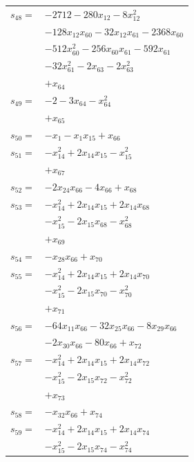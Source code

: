 \begin{longtable}{@{}r@{\;}l@{}}
\(s_{48}=\) & \(\displaystyle -2712 -280x_{12} -8x_{12}^{2}\) \\
 & \(\displaystyle -128x_{12}x_{60} -32x_{12}x_{61} -2368x_{60}\) \\
 & \(\displaystyle -512x_{60}^{2} -256x_{60}x_{61} -592x_{61}\) \\
 & \(\displaystyle -32x_{61}^{2} -2x_{63} -2x_{63}^{2}\) \\
 & \(\displaystyle +x_{64}\) \\[3pt]
\(s_{49}=\) & \(\displaystyle -2 -3x_{64} -x_{64}^{2}\) \\
 & \(\displaystyle +x_{65}\) \\[3pt]
\(s_{50}=\) & \(\displaystyle -x_{1} -x_{1}x_{15} +x_{66}\) \\[3pt]
\(s_{51}=\) & \(\displaystyle -x_{14}^{2} +2x_{14}x_{15} -x_{15}^{2}\) \\
 & \(\displaystyle +x_{67}\) \\[3pt]
\(s_{52}=\) & \(\displaystyle -2x_{24}x_{66} -4x_{66} +x_{68}\) \\[3pt]
\(s_{53}=\) & \(\displaystyle -x_{14}^{2} +2x_{14}x_{15} +2x_{14}x_{68}\) \\
 & \(\displaystyle -x_{15}^{2} -2x_{15}x_{68} -x_{68}^{2}\) \\
 & \(\displaystyle +x_{69}\) \\[3pt]
\(s_{54}=\) & \(\displaystyle -x_{28}x_{66} +x_{70}\) \\[3pt]
\(s_{55}=\) & \(\displaystyle -x_{14}^{2} +2x_{14}x_{15} +2x_{14}x_{70}\) \\
 & \(\displaystyle -x_{15}^{2} -2x_{15}x_{70} -x_{70}^{2}\) \\
 & \(\displaystyle +x_{71}\) \\[3pt]
\(s_{56}=\) & \(\displaystyle -64x_{11}x_{66} -32x_{25}x_{66} -8x_{29}x_{66}\) \\
 & \(\displaystyle -2x_{30}x_{66} -80x_{66} +x_{72}\) \\[3pt]
\(s_{57}=\) & \(\displaystyle -x_{14}^{2} +2x_{14}x_{15} +2x_{14}x_{72}\) \\
 & \(\displaystyle -x_{15}^{2} -2x_{15}x_{72} -x_{72}^{2}\) \\
 & \(\displaystyle +x_{73}\) \\[3pt]
\(s_{58}=\) & \(\displaystyle -x_{32}x_{66} +x_{74}\) \\[3pt]
\(s_{59}=\) & \(\displaystyle -x_{14}^{2} +2x_{14}x_{15} +2x_{14}x_{74}\) \\
 & \(\displaystyle -x_{15}^{2} -2x_{15}x_{74} -x_{74}^{2}\) \\

\end{longtable}
